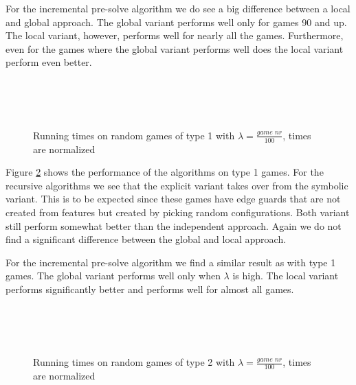 For the incremental pre-solve algorithm we do see a big difference between a local and global approach. The global variant performs well only for games 90 and up. The local variant, however, performs well for nearly all the games. Furthermore, even for the games where the global variant performs well does the local variant perform even better.
\begin{figure}[H]
	\centering
	\begin{multicols}{2}
		\\
		\\
		\\
		
	\end{multicols}
	\caption{Running times on random games of type 1 with $\lambda = \frac{\textit{game nr}}{100}$, times are normalized}
	\label{fig:results_type1}
\end{figure}%


Figure \ref{fig:results_type2} shows the performance of the algorithms on type 1 games. For the recursive algorithms we see that the explicit variant takes over from the symbolic variant. This is to be expected since these games have edge guards that are not created from features but created by picking random configurations. Both variant still perform somewhat better than the independent approach. Again we do not find a significant difference between the global and local approach.

For the incremental pre-solve algorithm we find a similar result as with type 1 games. The global variant performs well only when $\lambda$ is high. The local variant performs significantly better and performs well for almost all games.
\begin{figure}[H]
	\centering
	\begin{multicols}{2}
		\\
		\\
		\\
		
	\end{multicols}
	\caption{Running times on random games of type 2 with $\lambda = \frac{\textit{game nr}}{100}$, times are normalized}
	\label{fig:results_type2}
\end{figure}%

